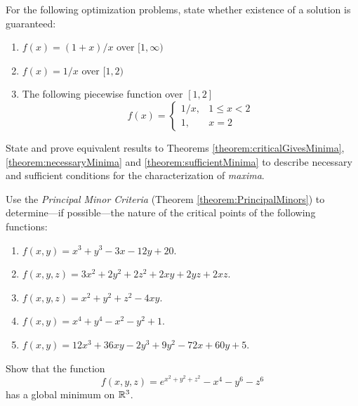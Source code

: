 \begin{problem}[Intermediate]
For the following optimization problems, state whether existence of a solution is guaranteed:
\begin{enumerate}
	\item $f(x) = (1+x)/x$ over $[1,\infty)$
	\item $f(x) = 1/x$ over $[1,2)$
	\item The following piecewise function over $[1,2]$
	\begin{equation*}
	f(x) = \begin{cases}
	1/x, &1\leq x<2 \\
	1,   &x=2
	\end{cases}
	\end{equation*}
\end{enumerate}
\end{problem}


\begin{problem}[Advanced]
State and prove equivalent results to Theorems \ref{theorem:criticalGivesMinima}, \ref{theorem:necessaryMinima} and \ref{theorem:sufficientMinima} to describe necessary and sufficient conditions for the characterization of \emph{maxima}.
\end{problem}

\begin{problem}[Basic]\cite[p.32, \#7]{peressini1988mathematics}
Use the \emph{Principal Minor Criteria} (Theorem \ref{theorem:PrincipalMinors}) to determine---if possible---the nature of the critical points of the following functions:
\begin{enumerate}
	\item $f(x,y) = x^3+y^3-3x-12y+20$.
	\item $f(x,y,z) = 3x^2+2y^2+2z^2+2xy+2yz+2xz$.
	\item $f(x,y,z) = x^2+y^2+z^2-4xy$.
	\item $f(x,y) = x^4+y^4-x^2-y^2+1$.
	\item $f(x,y) = 12x^3+36xy-2y^3+9y^2-72x+60y+5$.
\end{enumerate}
\end{problem}

\begin{problem}[Intermediate]\cite[p.35 \#26]{peressini1988mathematics}\label{problem:tricky}
Show that the function 
\begin{equation*}
f(x,y,z) = e^{x^2+y^2+z^2}-x^4-y^6-z^6
\end{equation*} 
has a global minimum on $\mathbb{R}^3$.
\end{problem}

